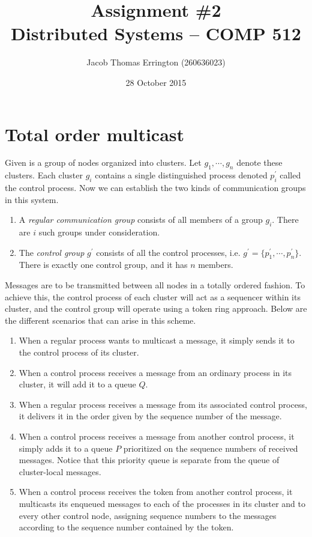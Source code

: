 \documentclass{article}
\author{Jacob Thomas Errington (260636023)}
\title{Assignment \#2\\Distributed Systems -- COMP 512}
\date{28 October 2015}
\begin{document}
\maketitle

\section{Total order multicast}

Given is a group of nodes organized into clusters. Let $g_1, \cdots, g_n$
denote these clusters. Each cluster $g_i$ contains a single distinguished
process denoted $p^\prime_i$ called the control process. Now we can establish
the two kinds of communication groups in this system.

\begin{enumerate}
    \item A \emph{regular communication group} consists of all members of
        a group $g_i$. There are $i$ such groups under consideration.
    \item The \emph{control group} $g^\prime$ consists of all the control
        processes, i.e. $g^\prime = \{p^\prime_1, \cdots, p^\prime_n\}$. There
        is exactly one control group, and it has $n$ members.
\end{enumerate}

Messages are to be transmitted between all nodes in a totally ordered fashion.
To achieve this, the control process of each cluster will act as a sequencer
within its cluster, and the control group will operate using a token ring
approach. Below are the different scenarios that can arise in this scheme.

\begin{enumerate}
    \item
        When a regular process wants to multicast a message, it simply sends it
        to the control process of its cluster.

    \item
        When a control process receives a message from an ordinary process in
        its cluster, it will add it to a queue $Q$.

    \item
        When a regular process receives a message from its associated control
        process, it delivers it in the order given by the sequence number of
        the message.

    \item
        When a control process receives a message from another control process,
        it simply adds it to a queue $P$ prioritized on the sequence numbers of
        received messages. Notice that this priority queue is separate from the
        queue of cluster-local messages.

    \item
        When a control process receives the token from another control process,
        it multicasts its enqueued messages to each of the processes in its
        cluster and to every other control node, assigning sequence numbers to
        the messages according to the sequence number contained by the token.
\end{enumerate}
\end{document}
